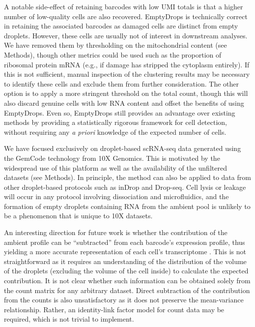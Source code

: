 \documentclass[10pt,letterpaper]{article}
\begin{document}
A notable side-effect of retaining barcodes with low UMI totals is that a higher number of low-quality cells are also recovered.
EmptyDrops is technically correct in retaining the associated barcodes as damaged cells are distinct from empty droplets.
However, these cells are usually not of interest in downstream analyses. 
We have removed them by thresholding on the mitochondrial content (see Methods), though other metrics could be used such as the proportion of ribosomal protein mRNA (e.g., if damage has stripped the cytoplasm entirely).
If this is not sufficient, manual inspection of the clustering results may be necessary to identify these cells and exclude them from further consideration.
The other option is to apply a more stringent threshold on the total count, though this will also discard genuine cells with low RNA content and offset the benefits of using EmptyDrops.
Even so, EmptyDrops still provides an advantage over existing methods by providing a statistically rigorous framework for cell detection, 
without requiring any \textit{a priori} knowledge of the expected number of cells.

We have focused exclusively on droplet-based scRNA-seq data generated using the GemCode technology from 10X Genomics.
This is motivated by the widespread use of this platform as well as the availability of the unfiltered datasets (see Methods).
In principle, the method can also be applied to data from other droplet-based protocols such as inDrop and Drop-seq. 
Cell lysis or leakage will occur in any protocol involving dissociation and microfluidics,
and the formation of empty droplets containing RNA from the ambient pool is unlikely to be a phenomenon that is unique to 10X datasets.

An interesting direction for future work is whether the contribution of the ambient profile can be ``subtracted'' from each barcode's expression profile, thus yielding a more accurate representation of each cell's transcriptome \cite{young2018soupx}.
This is not straightforward as it requires an understanding of the distribution of the volume of the droplets (excluding the volume of the cell inside) to calculate the expected contribution.
It is not clear whether such information can be obtained solely from the count matrix for any arbitrary dataset.
Direct subtraction of the contribution from the counts is also unsatisfactory as it does not preserve the mean-variance relationship.
Rather, an identity-link factor model for count data may be required, which is not trivial to implement. 
\end{document}
